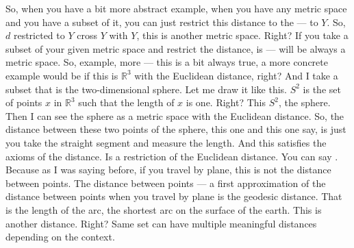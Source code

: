 \begin{spoken-clean}[00:17:15 - 00:19:15]
So, when you have a bit more abstract example, when you have any metric space and you have a subset of it, you can just restrict this distance to the --- to $Y$. So, $d$ restricted to $Y$ cross $Y$ with $Y$, this is another metric space. Right? If you take a subset of your given metric space and restrict the distance, is --- will be always a metric space. So, example, more --- this is a bit always true, a more concrete example would be if this is $\mathbb{R}^3$ with the Euclidean distance, right? And I take a subset that is the two-dimensional sphere. Let me draw it like this. $S^2$ is the set of points $x$ in $\mathbb{R}^3$ such that the length of $x$ is one. Right? This $S^2$, the sphere. Then I can see the sphere as a metric space with the Euclidean distance. So, the distance between these two points of the sphere, this one and this one say, is just you take the straight segment and measure the length. And this satisfies the axioms of the distance. Is a restriction of the Euclidean distance. You can say . Because as I was saying before, if you travel by plane, this is not the distance between points. The distance between points --- a first approximation of the distance between points when you travel by plane is the geodesic distance. That is the length of the arc, the shortest arc on the surface of the earth. This is another distance. Right? Same set can have multiple meaningful distances depending on the context.
\end{spoken-clean}

